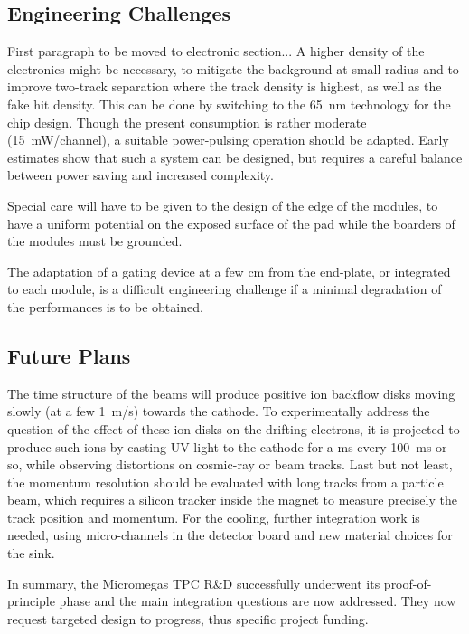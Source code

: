 \subsection{Engineering Challenges}
First paragraph to be moved to electronic section...
A higher density of the electronics might be necessary, to mitigate the background at small radius and to improve two-track separation
where the track density is highest, as well as the fake hit density. This can be done by switching to the \SI{65}{nm} technology for the
chip design. Though the present consumption is rather moderate (\SI{15}{mW/channel}), a suitable power-pulsing operation should be adapted.
Early estimates show that such a system can be designed, but requires a careful balance between power saving and increased complexity.

Special care will have to be given to the design of the edge of the modules, to have a uniform potential on the exposed surface of the pad while the boarders of the modules must be grounded.

The adaptation of a gating device at a few cm from the end-plate, or integrated to each module, is a
difficult engineering challenge if a minimal degradation of the performances is to be obtained.


\subsection{Future Plans}
The time structure of the beams will produce positive ion backflow disks moving slowly (at a few \SI{1}{m/s}) towards the cathode. To experimentally address the question of the effect of these ion disks on the drifting electrons, it is projected to produce such
ions by casting UV light to the cathode for a ms every \SI{100}{ms} or so, while observing distortions on cosmic-ray or beam tracks.
Last but not least, the momentum resolution should be evaluated with long tracks from a particle beam, which requires a silicon
tracker inside the magnet to measure precisely the track position and momentum. For the cooling, further integration work is needed, using micro-channels in the detector board and new material choices for the sink.

In summary, the Micromegas TPC R\&D successfully underwent its proof-of-principle phase and the main integration questions are now addressed. They now request targeted design to progress, thus specific project funding.
